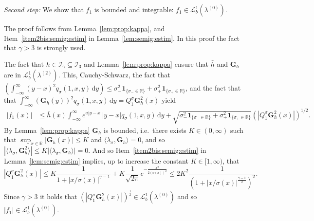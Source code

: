 \documentclass[12pt]{article}
\numberwithin{equation}{section}
\theoremstyle{definition}
\theoremstyle{remark}
\newcommand{\RR}{\mathbb{R}}
\newcommand{\EE}{\mathbb{E}}
\newcommand{\ind}[1]{\mathbf{1}_{#1}}
\newcommand{\vd}{\,\mathrm{d}}
\newcommand{\Lgb}[1]{\mathcal{L}^{1}_{b}(\lambda^{(#1)})}
\newcommand{\Lg}[1]{\mathcal{I}_{#1}}
\newcommand{\bfG}[1]{\mathbf{G}_{#1}}
\begin{document}
{\it Second step:} We show that $f_1$ is bounded and integrable: $f_1\in \Lgb{0}$.
  
The proof follows from Lemma~\ref{lem:prop:kappa}, and Item~\ref{item2bis:semig:estim} in Lemma~\ref{lem:semig:estim}. In this proof the fact that $\gamma>3$ is strongly used.

The fact that $h\in \Lg{\gamma}\subseteq \Lg{3}$ and Lemma~\ref{lem:prop:kappa} ensure that 
$\bar h$ and $\bfG{h}$ are in $\Lgb{2}$.
This, Cauchy-Schwarz, the fact that 
$
	\left(\int_{-\infty}^{\infty} (y-x)^2 q_\sigma(1,x,y) \vd y\right) 
	\leq \sigma_-^2 \ind{\{\sigma_-\in\RR\}} +\sigma_+^2 \ind{\{\sigma_+\in\RR\}}
$,
and the fact that that $\int_{-\infty}^{\infty}  (\bfG{h}(y))^2 q_\sigma(1,x,y) \vd y = Q^\sigma_1 \bfG{h}^2 (x)$
yield
\begin{equation}
\begin{split} 
	|f_1(x)|  
	&
	\leq \bar h(x) \int_{-\infty}^{\infty}  e^{a |y-x|} |y-x| q_\sigma(1,x,y) \vd y
	+ \sqrt{\sigma_-^2 \ind{\{\sigma_-\in\RR\}} +\sigma_+^2 \ind{\{\sigma_+\in\RR\}}} \left( |Q^\sigma_1 \bfG{h}^2 (x)| \right)^{\!1/2}.
\end{split}
\end{equation}
By Lemma~\ref{lem:prop:kappa} $\bfG{h}$ is bounded, i.e.~there exists $K\in (0,\infty)$ such that 
$\sup_{x\in \RR}|\bfG{h}(x)|\leq K$ and $\langle \lambda_\sigma , \bfG{h} \rangle=0 $, and so
$
	| \langle \lambda_\sigma , \bfG{h}^2 \rangle | \leq K  | \langle \lambda_\sigma , \bfG{h} \rangle | =0.
$
And so Item~\ref{item2bis:semig:estim} in Lemma~\ref{lem:semig:estim} implies, up to increase the constant $K\in [1,\infty)$, %
that
\begin{equation}
	|Q^\sigma_1 \bfG{h}^2 (x)| \leq K \frac{1}{1+|x/\sigma(x)|^{\gamma-1}} + K \frac1{\sqrt{2 \pi}} e^{-\frac{x^2}{2 (\sigma(x))^2 }} 
\leq 2 K^2 \frac{1}{(1+|x/\sigma(x)|^{\frac{\gamma-1}{2}})^2} .
\end{equation}
Since $\gamma >3 $ it holds that $\left( |Q^\sigma_1 \bfG{h}^2 (x)| \right)^{\!\frac12}\in \Lgb{0}$ and so $|f_1|\in \Lgb{0}$.
\end{document}

